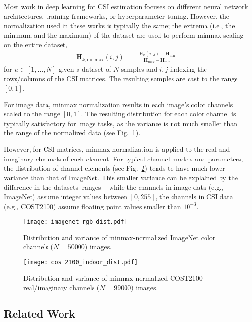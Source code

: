 
Most work in deep learning for CSI estimation focuses on different neural network architectures, training frameworks, or hyperparameter tuning. However, the normalization used in these works is typically the same; the extrema (i.e., the minimum and the maximum) of the dataset are used to perform minmax scaling on the entire dataset, 
\begin{align*}
	\mathbf H_{k,\text{minmax}}(i,j) &= \frac{\mathbf H_k(i,j)-\mathbf H_{\text{min}}}{\mathbf H_{\text{max}}-\mathbf H_{\text{min}}}
\end{align*}
for $n \in [1,\dots,N]$ given a dataset of $N$ samples and $i,j$ indexing the rows/columns of the CSI matrices. The resulting samples are cast to the range $[0,1]$.

For image data, minmax normalization results in each image's color channels scaled to the range $[0,1]$. The resulting distribution for each color channel is typically satisfactory for image tasks, as the variance is not much smaller than the range of the normalized data (see Fig.~\ref{fig:imagenet_dist}).

However, for CSI matrices, minmax normalization is applied to the real and imaginary channels of each element. For typical channel models and parameters, the distribution of channel elements (see Fig.~\ref{fig:cost_indoor_dist}) tends to have much lower variance than that of ImageNet. This smaller variance can be explained by the difference in the datasets' ranges -- while the channels in image data (e.g., ImageNet) assume integer values between $[0,255]$, the channels in CSI data (e.g., COST2100) assume floating point values smaller than $10^{-3}$.

\begin{figure}[htb]
	\centering
	\texttt{[image: imagenet\_rgb\_dist.pdf]}
	\medskip
	\caption{Distribution and variance of minmax-normalized ImageNet color channels ($N=50000$) images.}
	\label{fig:imagenet_dist}
\end{figure}

\begin{figure}[htb]
	\centering
	\texttt{[image: cost2100\_indoor\_dist.pdf]}
	\medskip
	\caption{Distribution and variance of minmax-normalized COST2100 real/imaginary channels ($N=99000$) images.}
	\label{fig:cost_indoor_dist}
\end{figure}

\subsection{Related Work}

